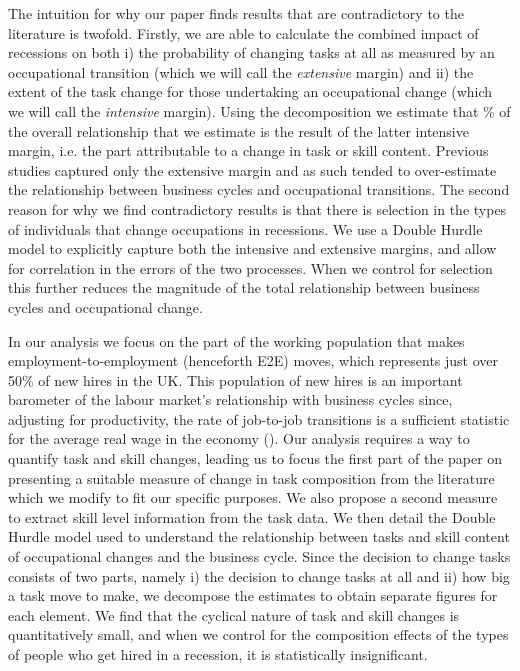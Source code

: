 \documentclass[12pt,authoryear]{elsarticle}
\begin{document}
	
	
	
	
	\vspace{2mm}
	
	
	\noindent The intuition for why our paper finds results that are contradictory to the literature is twofold.  Firstly, we are able to calculate the combined impact of recessions on both i) the probability of changing tasks at all as measured by an occupational transition (which we will call the \textit{extensive} margin) and ii) the extent of the task change for those undertaking an occupational change (which we will call the \textit{intensive} margin). Using the \cite{Mcdonald1980} decomposition we estimate that \hspace{-1mm}\% of the overall relationship that we estimate is the result of the latter intensive margin, i.e. the part attributable to a change in task or skill content. Previous studies captured only the extensive margin and as such tended to over-estimate the relationship between business cycles and occupational transitions. The second reason for why we find contradictory results is that there is selection in the types of individuals that change occupations in recessions. We use a Double Hurdle model to explicitly capture both the intensive and extensive margins, and allow for correlation in the errors of the two processes. When we control for selection this further reduces the magnitude of the total relationship between business cycles and occupational change.
	
	
	
	
	\vspace{2mm}
	
	In our analysis we focus on the part of the working population that makes employment-to-employment (henceforth E2E) moves, which represents just over 50\% of new hires in the UK. This population of new hires is an important barometer of the labour market's relationship with  business cycles since, adjusting for productivity, the rate of job-to-job transitions is a sufficient statistic for the average real wage in the economy (\cite{MoscariniPostelVinay}). Our analysis requires a way to quantify task and skill changes, leading us to focus the first part of the paper on presenting a suitable measure of change in task composition from the literature which we modify to fit our specific purposes. We also propose a second measure to extract skill level information from the task data. We then detail the Double Hurdle model used to understand the relationship between tasks and skill content of occupational changes and the business cycle. Since the decision to change tasks consists of two parts, namely i) the decision to change tasks at all and ii) how big a task move to make, we decompose the estimates to obtain separate figures for each element. We find that the cyclical nature of task and skill changes is quantitatively small, and when we control for the composition effects of the types of people who get hired in a recession, it is statistically insignificant. 
	
\end{document}
